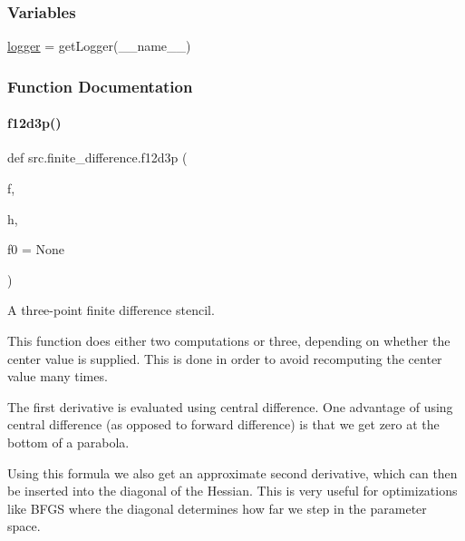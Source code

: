 \subsubsection*{Variables}
\begin{DoxyCompactItemize}
\item 
\hyperlink{namespacesrc_1_1finite__difference_a75d4771fe24a9e75631674733a10cfa9}{logger} = get\+Logger(\+\_\+\+\_\+name\+\_\+\+\_\+)
\end{DoxyCompactItemize}


\subsubsection{Function Documentation}
\mbox{\label{namespacesrc_1_1finite__difference_a32a990bb791a59853130d9d71387822d}} 
\paragraph{\texorpdfstring{f12d3p()}{f12d3p()}}
{\footnotesize\ttfamily def src.\+finite\+\_\+difference.\+f12d3p (\begin{DoxyParamCaption}\item[{}]{f,  }\item[{}]{h,  }\item[{}]{f0 = {\ttfamily None} }\end{DoxyParamCaption})}



A three-\/point finite difference stencil. 

This function does either two computations or three, depending on whether the \textquotesingle{}center\textquotesingle{} value is supplied. This is done in order to avoid recomputing the center value many times.

The first derivative is evaluated using central difference. One advantage of using central difference (as opposed to forward difference) is that we get zero at the bottom of a parabola.

Using this formula we also get an approximate second derivative, which can then be inserted into the diagonal of the Hessian. This is very useful for optimizations like B\+F\+GS where the diagonal determines how far we step in the parameter space.

